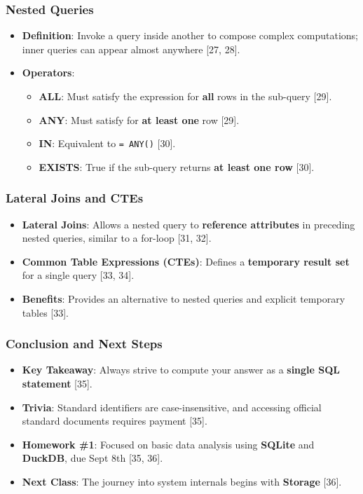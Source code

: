 \documentclass{beamer}
\begin{document}
\begin{frame}
\frametitle{Nested Queries}
\begin{itemize}
    \item \textbf{Definition}: Invoke a query inside another to compose complex computations; inner queries can appear almost anywhere [27, 28].
    \item \textbf{Operators}:
    \begin{itemize}
        \item \textbf{ALL}: Must satisfy the expression for \textbf{all} rows in the sub-query [29].
        \item \textbf{ANY}: Must satisfy for \textbf{at least one} row [29].
        \item \textbf{IN}: Equivalent to \texttt{= ANY()} [30].
        \item \textbf{EXISTS}: True if the sub-query returns \textbf{at least one row} [30].
    \end{itemize}
\end{itemize}
\end{frame}

\begin{frame}
\frametitle{Lateral Joins and CTEs}
\begin{itemize}
    \item \textbf{Lateral Joins}: Allows a nested query to \textbf{reference attributes} in preceding nested queries, similar to a for-loop [31, 32].
    \item \textbf{Common Table Expressions (CTEs)}: Defines a \textbf{temporary result set} for a single query [33, 34].
    \item \textbf{Benefits}: Provides an alternative to nested queries and explicit temporary tables [33].
\end{itemize}
\end{frame}

\begin{frame}
\frametitle{Conclusion and Next Steps}
\begin{itemize}
    \item \textbf{Key Takeaway}: Always strive to compute your answer as a \textbf{single SQL statement} [35].
    \item \textbf{Trivia}: Standard identifiers are case-insensitive, and accessing official standard documents requires payment [35].
    \item \textbf{Homework \#1}: Focused on basic data analysis using \textbf{SQLite} and \textbf{DuckDB}, due Sept 8th [35, 36].
    \item \textbf{Next Class}: The journey into system internals begins with \textbf{Storage} [36].
\end{itemize}
\end{frame}
\end{document}
